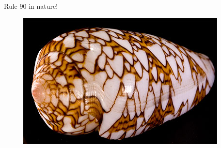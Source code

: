 \documentclass{eecslides}
\begin{document}

	\begin{frame}{Rule 90 in nature!}

		\begin{figure}[!t]
			\includegraphics[height=0.55\textheight]{snail}
		\end{figure}

	\end{frame}

\end{document}
